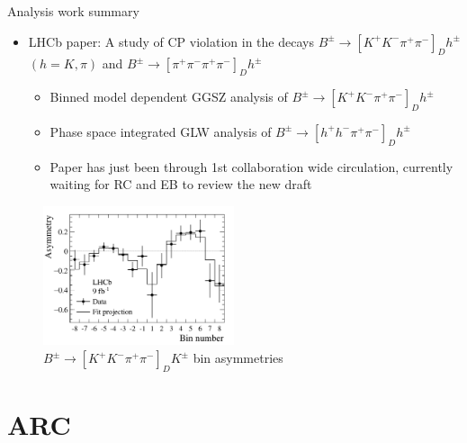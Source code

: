\documentclass{beamer}
\begin{document}
\begin{frame}{Analysis work summary}
  \begin{itemize}
    \item{LHCb paper: A study of CP violation in the decays $B^\pm\to[K^+K^-\pi^+\pi^-]_Dh^\pm$ $(h = K, \pi)$ and $B^\pm\to[\pi^+\pi^-\pi^+\pi^-]_Dh^\pm$}
    \begin{itemize}
      \item{Binned model dependent GGSZ analysis of $B^\pm\to[K^+K^-\pi^+\pi^-]_Dh^\pm$}
      \item{Phase space integrated GLW analysis of $B^\pm\to[h^+h^-\pi^+\pi^-]_Dh^\pm$}
      \item{Paper has just been through 1st collaboration wide circulation, currently waiting for RC and EB to review the new draft}
    \end{itemize}
  \end{itemize}
  \begin{figure}
    \includegraphics[width = 0.5\textwidth, page = 1]{Plots/BinAsymmetries_dk.png}
    \caption{$B^\pm\to[K^+K^-\pi^+\pi^-]_DK^\pm$ bin asymmetries}
  \end{figure}
\end{frame}

\section{ARC}
\end{document}
